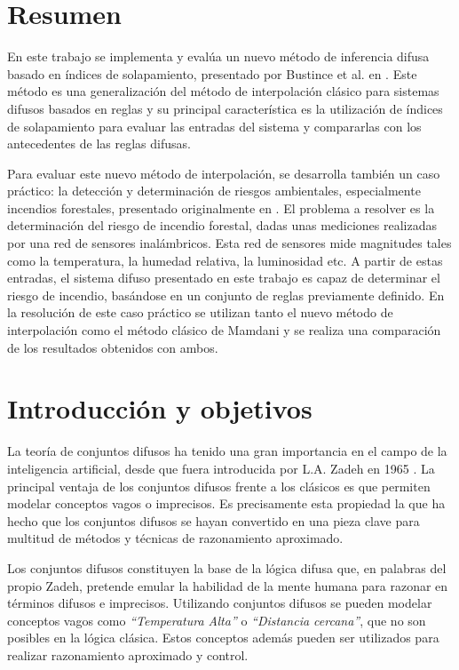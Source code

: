 
\chapter{Resumen}
En este trabajo se implementa y evalúa un nuevo método de inferencia difusa basado en índices de solapamiento, presentado por Bustince et al. en \cite{bustince2013overlap}. Este método es una generalización del método de interpolación clásico para sistemas difusos basados en reglas y su principal característica es la utilización de índices de solapamiento \cite{bustince2009overlap} para evaluar las entradas del sistema y compararlas con los antecedentes de las reglas difusas.

Para evaluar este nuevo método de interpolación, se desarrolla también un caso práctico: la detección y determinación de riesgos ambientales, especialmente incendios forestales, presentado originalmente en \cite{bolourchi2013}. El problema a resolver es la determinación del riesgo de incendio forestal, dadas unas mediciones realizadas por una red de sensores inalámbricos. Esta red de sensores mide magnitudes tales como la temperatura, la humedad relativa, la luminosidad etc. A partir de estas entradas, el sistema difuso presentado en este trabajo es capaz de determinar el riesgo de incendio, basándose en un conjunto de reglas previamente definido. En la resolución de este caso práctico se utilizan tanto el nuevo método de interpolación como el método clásico de Mamdani \cite{Mamdani1975} y se realiza una comparación de los resultados obtenidos con ambos.

\chapter{Introducción y objetivos}
La teoría de conjuntos difusos ha tenido una gran importancia en el campo de la inteligencia artificial, desde que fuera introducida por L.A. Zadeh en 1965 \cite{Zadeh65}. La principal ventaja de los conjuntos difusos frente a los clásicos es que permiten modelar conceptos vagos o imprecisos. Es precisamente esta propiedad la que ha hecho que los conjuntos difusos se hayan convertido en una pieza clave para multitud de métodos y técnicas de razonamiento aproximado.

Los conjuntos difusos constituyen la base de la lógica difusa que, en palabras del propio Zadeh, pretende emular la habilidad de la mente humana para razonar en términos difusos e imprecisos. Utilizando conjuntos difusos se pueden modelar conceptos vagos como \emph{``Temperatura Alta''} o \emph{``Distancia cercana''}, que no son posibles en la lógica clásica. Estos conceptos además pueden ser utilizados para realizar razonamiento aproximado y control.


